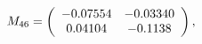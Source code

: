 \begin{equation}
M_{46}=
\left(
\begin{array}{c c}
-0.07554&
-0.03340\\
0.04104&
-0.1138\\
\end{array}
\right),
\end{equation}

